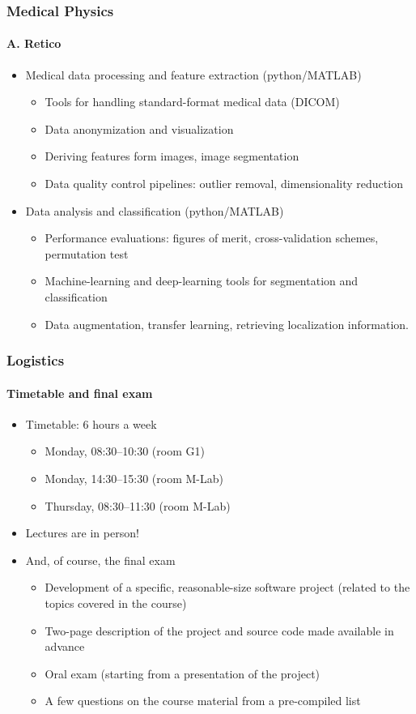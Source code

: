 \documentclass[9pt]{beamer}
\begin{document}
\begin{frame}
  \frametitle{Medical Physics}
  \framesubtitle{A. Retico}
  \begin{itemize}
  \item Medical data processing and feature extraction (python/MATLAB)%
    \begin{itemize}
    \item Tools for handling standard-format medical data (DICOM)
    \item Data anonymization and visualization
    \item Deriving features form images, image segmentation
    \item Data quality control pipelines: outlier removal, dimensionality
      reduction
    \end{itemize}
  \item Data analysis and classification (python/MATLAB)
    \begin{itemize}
    \item Performance evaluations: figures of merit, cross-validation schemes,
      permutation test
    \item Machine-learning and deep-learning tools for segmentation and
      classification
    \item Data augmentation, transfer learning, retrieving localization
      information.
    \end{itemize}
  \end{itemize}
\end{frame}


\begin{frame}
  \frametitle{Logistics}
  \framesubtitle{Timetable and final exam}
  \begin{itemize}
  \item Timetable: 6 hours a week
    \begin{itemize}
    \item Monday, 08:30--10:30 (room G1)
    \item Monday, 14:30--15:30 (room M-Lab)
    \item Thursday, 08:30--11:30 (room M-Lab)
    \end{itemize}
  \item \alert{Lectures are in person!}
  \item And, of course, the final exam
    \begin{itemize}
    \item Development of a specific, reasonable-size software project
      (related to the topics covered in the course)
    \item Two-page description of the project and source code made
      available in advance
    \item Oral exam (starting from a presentation of the project)
    \item \alert{A few questions on the course material from a pre-compiled list}
    \end{itemize}
  \end{itemize}
\end{frame}
\end{document}
